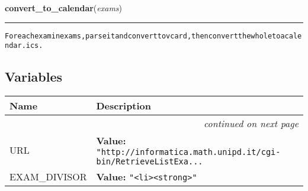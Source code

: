     \label{src:fiup_exams_calendar:convert_to_calendar}

    \vspace{0.5ex}

\hspace{.8\funcindent}\begin{boxedminipage}{\funcwidth}

    \raggedright \textbf{convert\_to\_calendar}(\textit{exams})

    \vspace{-1.5ex}

    \rule{\textwidth}{0.5\fboxrule}
\setlength{\parskip}{2ex}
\begin{alltt}
For each exam in exams, parse it and convert to vcard, then convert the whole to a calendar .ics. 
\end{alltt}

\setlength{\parskip}{1ex}
    \end{boxedminipage}



  \subsection{Variables}

    \vspace{-1cm}
\hspace{\varindent}\begin{longtable}{|p{\varnamewidth}|p{\vardescrwidth}|l}
\cline{1-2}
\cline{1-2} \centering \textbf{Name} & \centering \textbf{Description}& \\
\cline{1-2}
\endhead\cline{1-2}\multicolumn{3}{r}{\small\textit{continued on next page}}\\\endfoot\cline{1-2}
\endlastfoot\raggedright U\-R\-L\- & \raggedright \textbf{Value:} 
{\tt "http://informatica.math.unipd.it/cgi-bin/RetrieveListExa\texttt{...}}&\\
\cline{1-2}
\raggedright E\-X\-A\-M\-\_\-D\-I\-V\-I\-S\-O\-R\- & \raggedright \textbf{Value:} 
{\tt "{\textless}li{\textgreater}{\textless}strong{\textgreater}"}&\\
\cline{1-2}
\end{longtable}


